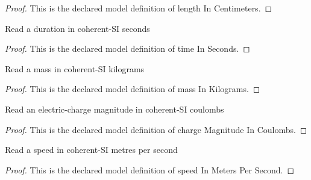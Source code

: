 \begin{proof}
  This is the declared model definition of length In Centimeters.
\end{proof}
\begin{definition}
  \label{def:physics:phyx-mini-0957:phyxminiproblems-problemphyxmini0957-timeinseconds}
  Read a duration in coherent-SI seconds
\end{definition}
\begin{proof}
  This is the declared model definition of time In Seconds.
\end{proof}
\begin{definition}
  \label{def:physics:phyx-mini-0957:phyxminiproblems-problemphyxmini0957-massinkilograms}
  Read a mass in coherent-SI kilograms
\end{definition}
\begin{proof}
  This is the declared model definition of mass In Kilograms.
\end{proof}
\begin{definition}
  \label{def:physics:phyx-mini-0957:phyxminiproblems-problemphyxmini0957-chargemagnitudeincoulombs}
  Read an electric-charge magnitude in coherent-SI coulombs
\end{definition}
\begin{proof}
  This is the declared model definition of charge Magnitude In Coulombs.
\end{proof}
\begin{definition}
  \label{def:physics:phyx-mini-0957:phyxminiproblems-problemphyxmini0957-speedinmeterspersecond}
  Read a speed in coherent-SI metres per second
\end{definition}
\begin{proof}
  This is the declared model definition of speed In Meters Per Second.
\end{proof}
